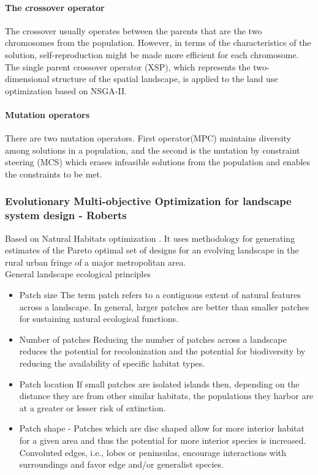 \documentclass{sig-alternate}
\begin{document}
\paragraph*{The crossover operator}
The crossover usually operates between the parents that are the two chromosomes from the population. However, in terms of the characteristics of the solution, self-reproduction might be made more efficient for each chromosome. The single parent crossover operator (XSP), which represents the two-dimensional structure of the spatial landscape, is applied to the land use optimization based on NSGA-II.

\paragraph*{Mutation operators}
There are two mutation operators. First operator(MPC) maintains diversity among solutions in a population, and the second is the mutation by constraint steering (MCS) which erases infeasible solutions from the population and enables the constraints to be met. 

\subsubsection{Evolutionary Multi-objective Optimization for landscape system design - Roberts}
 Based on Natural Habitats optimization . It uses methodology for generating estimates of the Pareto optimal set of designs for an evolving landscape in the rural urban fringe of a major metropolitan area.\\
 General landscape ecological principles
\begin{itemize}
  \item Patch size The term patch refers to a contiguous extent of natural features across
a landscape. In general, larger patches are better than smaller patches for
sustaining natural ecological functions.
  \item Number of patches Reducing the number of patches across a landscape reduces
the potential for recolonization and the potential for biodiversity by reducing the
availability of specific habitat types.
  \item Patch location If small patches are isolated islands then, depending on the
distance they are from other similar habitats, the populations they harbor are at a
greater or lesser risk of extinction.
  \item Patch shape -  Patches which are disc shaped allow for more interior habitat for a
given area and thus the potential for more interior species is increased. Convoluted
edges, i.e., lobes or peninsulas, encourage interactions with surroundings and favor
edge and/or generalist species.
\end{itemize}
\end{document}
